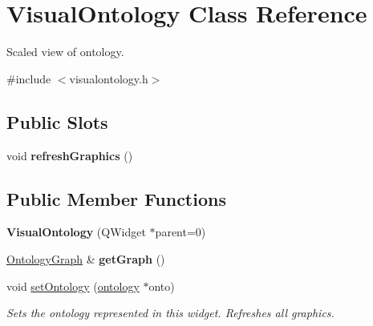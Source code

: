 \hypertarget{class_visual_ontology}{\section{\-Visual\-Ontology \-Class \-Reference}
\label{class_visual_ontology}
}


\-Scaled view of ontology.  




{\ttfamily \#include $<$visualontology.\-h$>$}

\subsection*{\-Public \-Slots}
\begin{DoxyCompactItemize}
\item 
\hypertarget{class_visual_ontology_ac936cb33c39a3ca64bf112d453a73600}{void {\bfseries refresh\-Graphics} ()}\label{class_visual_ontology_ac936cb33c39a3ca64bf112d453a73600}

\end{DoxyCompactItemize}
\subsection*{\-Public \-Member \-Functions}
\begin{DoxyCompactItemize}
\item 
\hypertarget{class_visual_ontology_a64f5451380543b996a06e3f20290ef41}{{\bfseries \-Visual\-Ontology} (\-Q\-Widget $\ast$parent=0)}\label{class_visual_ontology_a64f5451380543b996a06e3f20290ef41}

\item 
\hypertarget{class_visual_ontology_abe651c8a9cdc8e92f912e6388ac2b85b}{\hyperlink{class_ontology_graph}{\-Ontology\-Graph} \& {\bfseries get\-Graph} ()}\label{class_visual_ontology_abe651c8a9cdc8e92f912e6388ac2b85b}

\item 
\hypertarget{class_visual_ontology_a9b6979930d51470346c770310072449a}{void \hyperlink{class_visual_ontology_a9b6979930d51470346c770310072449a}{set\-Ontology} (\hyperlink{classmbdev__ontology_1_1ontology}{ontology} $\ast$onto)}\label{class_visual_ontology_a9b6979930d51470346c770310072449a}

\begin{DoxyCompactList}\small\item\em \-Sets the ontology represented in this widget. \-Refreshes all graphics. \end{DoxyCompactList}\end{DoxyCompactItemize}



